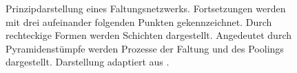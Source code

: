 \begin{figure}[H]
\begin{tikzpicture}
				
			\end{tikzpicture}
			\caption{Prinzipdarstellung eines Faltungsnetzwerks. Fortsetzungen werden mit drei aufeinander folgenden Punkten gekennzeichnet. Durch rechteckige Formen werden Schichten dargestellt. Angedeutet durch Pyramidenstümpfe werden Prozesse der Faltung und des Poolings dargestellt. Darstellung adaptiert aus \cite{carpng,todasc}.}
			\label{fig: cnntyp}
		\end{figure}